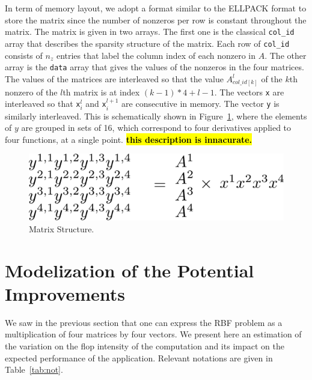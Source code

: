 \documentclass[10pt,conference,compsocconf]{IEEEtran}
\newcommand{\todo}[1]{{\color{red}\textbf{\hl{#1}}\xspace}}
\begin{document}
In term of memory layout, we adopt a format similar to the ELLPACK
format to store the matrix since the number of nonzeros per row is
constant throughout the matrix. The matrix is given in two arrays. The
first one is the classical {\tt col\_id} array that describes the
sparsity structure of the matrix. Each row of {\tt col\_id} consists of $n_z$
entries that label the column index of each nonzero in $A$. The
other array is the {\tt data} array that gives the values of the 
nonzeros in the four matrices. The values of the matrices are interleaved
so that the value $A^l_{col\_id[k]}$ of the $k$th nonzero of the
$l$th matrix is at index $(k-1)*4+l-1$. The vectors {\tt x} are 
interleaved so that {\tt x}$^l_i$ and {\tt x}$^{l+1}_i$ are
consecutive in memory. The vector {\tt y} is similarly
interleaved. This is schematically shown in Figure~\ref{fig:mat_struct}, 
where the elements of $y$ are grouped in sets of 16, which correspond
to four derivatives applied to four functions, at a single point. \todo{this description is innacurate.}

\begin{figure}
  \centering
  \includegraphics[width=\linewidth]{figures/matrix_not.pdf}
  \caption{Matrix Structure.}
  \label{fig:mat_struct}
\end{figure}


\section{Modelization of the Potential Improvements}
\label{sec:model}

We saw in the previous section that one can express the RBF problem as
a multiplication of four matrices by four vectors. We present here an
estimation of the variation on the flop intensity of the computation
and its impact on the expected performance of the
application. Relevant notations are given in Table~\ref{tab:not}.
\end{document}
